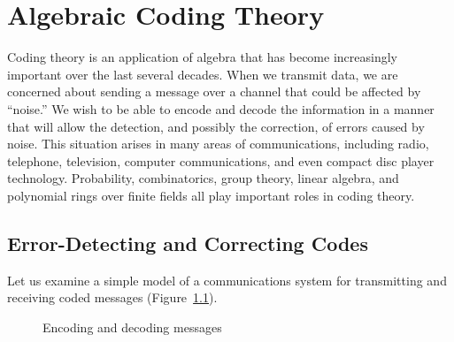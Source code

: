 \chapter{Algebraic Coding Theory}\label{algcodes}
 
 
 
Coding theory is an application of algebra that has become
increasingly important over the last several decades. When we transmit
data, we are concerned about sending a message over a channel that
could be affected by ``noise.'' We wish to be able to encode and
decode the information in a manner that will allow the detection, and
possibly the correction, of errors caused by noise. This situation
arises in many areas of communications, including radio, telephone,
television, computer communications, and even compact disc player
technology. Probability, combinatorics, group theory, linear algebra,
and polynomial rings over finite fields all play important roles in
coding theory.  
 
 
 
\section{Error-Detecting and Correcting Codes}
 
 
Let us examine a simple model of a communications system for
transmitting and receiving coded messages (Figure~\ref{encoding}).  

\begin{figure}[htb] %
\begin{center}


\caption{Encoding and decoding messages}
\end{center}
\label{encoding}
\end{figure}

